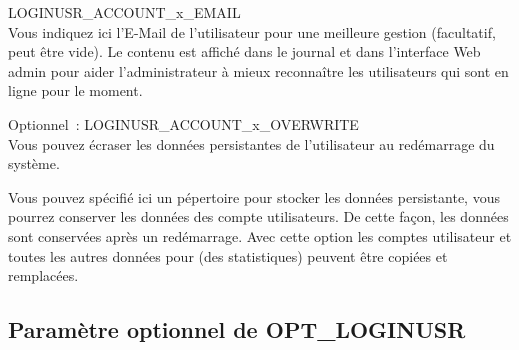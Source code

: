 \begin{description}

  LOGINUSR\_ACCOUNT\_x\_EMAIL\\
  Vous indiquez ici l'E-Mail de l'utilisateur pour une meilleure gestion
  (facultatif, peut être vide). Le contenu est affiché dans le journal et
  dans l'interface Web admin pour aider l'administrateur à mieux reconnaître
  les utilisateurs qui sont en ligne pour le moment.



  Optionnel~: LOGINUSR\_ACCOUNT\_x\_OVERWRITE\\
  Vous pouvez écraser les données persistantes de l'utilisateur au redémarrage du système.

   Vous pouvez spécifié ici un pépertoire pour stocker les données persistante,
   vous pourrez conserver les données des compte utilisateurs. De cette façon,
   les données sont conservées après un redémarrage. Avec cette option les
   comptes utilisateur et toutes les autres données pour (des statistiques) peuvent
   être copiées et remplacées.
\end{description}

\subsection {Paramètre optionnel de OPT\_LOGINUSR}


